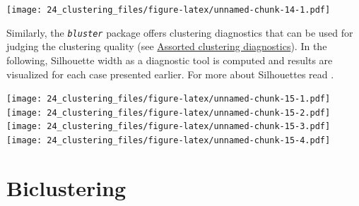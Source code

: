 \documentclass[
]{book}
\newenvironment{Shaded}{\begin{snugshade}}{\end{snugshade}}
\newcommand{\AttributeTok}[1]{\textcolor[rgb]{0.77,0.63,0.00}{#1}}
\newcommand{\CommentTok}[1]{\textcolor[rgb]{0.56,0.35,0.01}{\textit{#1}}}
\newcommand{\ControlFlowTok}[1]{\textcolor[rgb]{0.13,0.29,0.53}{\textbf{#1}}}
\newcommand{\FunctionTok}[1]{\textcolor[rgb]{0.00,0.00,0.00}{#1}}
\newcommand{\NormalTok}[1]{#1}
\newcommand{\OtherTok}[1]{\textcolor[rgb]{0.56,0.35,0.01}{#1}}
\newcommand{\SpecialCharTok}[1]{\textcolor[rgb]{0.00,0.00,0.00}{#1}}
\newcommand{\StringTok}[1]{\textcolor[rgb]{0.31,0.60,0.02}{#1}}
\begin{document}
\texttt{[image: 24\_clustering\_files/figure-latex/unnamed-chunk-14-1.pdf]}

Similarly, the \emph{\texttt{bluster}} \citep{R-bluster} package offers clustering
diagnostics that can be used for judging the clustering quality (see
\href{http://bioconductor.org/packages/release/bioc/vignettes/bluster/inst/doc/diagnostics.html}{Assorted clustering
diagnostics}).
In the following, Silhouette width as a diagnostic tool is computed
and results are visualized for each case presented earlier. For more
about Silhouettes read \citep{Rousseeuw1987}.

\begin{Shaded}
\end{Shaded}

\texttt{[image: 24\_clustering\_files/figure-latex/unnamed-chunk-15-1.pdf]} \texttt{[image: 24\_clustering\_files/figure-latex/unnamed-chunk-15-2.pdf]} \texttt{[image: 24\_clustering\_files/figure-latex/unnamed-chunk-15-3.pdf]} \texttt{[image: 24\_clustering\_files/figure-latex/unnamed-chunk-15-4.pdf]}

\hypertarget{biclustering}{%
\section{Biclustering}\label{biclustering}}
\end{document}
